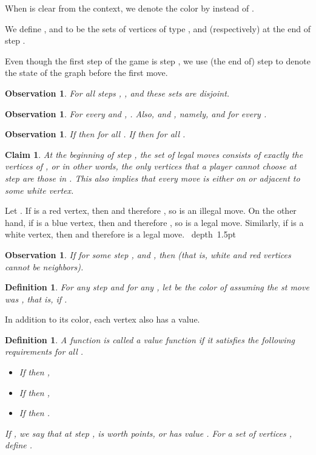 \documentclass[11pt]{article}
\def\Proof{\par\noindent{\bf Proof:~}}
\def\blackslug{\hbox{\hskip 1pt \vrule width 4pt height 8pt
    depth 1.5pt \hskip 1pt}}
\def\QED{\quad\blackslug\lower 8.5pt\null\par}
\def\dnsitem{\vspace{-7pt}\item}
\newtheorem{definition}[theorem]{Definition}
\newtheorem{claim}[theorem]{Claim}
\newtheorem{observation}[theorem]{Observation}
\theoremstyle{definition}
\begin{document}
When  is clear from the context, we denote the color by  instead of .

We define ,  and  to be the sets of vertices of type ,  and  (respectively) at the end of step .

Even though the first step of the game is step , we use (the end of) step  to denote the state of the graph before the first move.

\begin{observation}
For all steps , , and these sets are disjoint.
\end{observation}

\begin{observation}
For every  and , .
Also,  and , namely,  and  for every .
\end{observation}

\begin{observation}
If  then  for all .
If  then  for all .
\end{observation}

\begin{claim}
\label{claim:legal_moves}
At the beginning of step , the set of legal moves consists of exactly the vertices of , 
or in other words, the only vertices that a player cannot choose at step  are those in .
This also implies that every move is either on or adjacent to some white vertex.
\end{claim}
\Proof
Let .
If  is a red vertex, then  and therefore , so  is an illegal move.
On the other hand,
if  is a blue vertex, then  and therefore , so  is a legal move.
Similarly, 
if  is a white vertex, then  and therefore  is a legal move.
\QED

\begin{observation}
\label{obs:edges_no_r}
If for some step ,  and , then  
(that is, white and red vertices cannot be neighbors).
\end{observation}

\begin{definition}
For any step  and for any , 
let  be the color of  assuming the st move was , that is,  if .
\end{definition}

In addition to its color, each vertex also has a value.

\begin{definition}
A function  is called a \emph{value} function if it satisfies the following requirements for all .
\begin{itemize}
	\dnsitem If  then ,
	\dnsitem If  then ,
	\dnsitem If  then .
\end{itemize}
If , we say that at step ,  is \emph{worth}  points, or \emph{has value} .
For a set of vertices , define . 
\end{definition}
\end{document}

